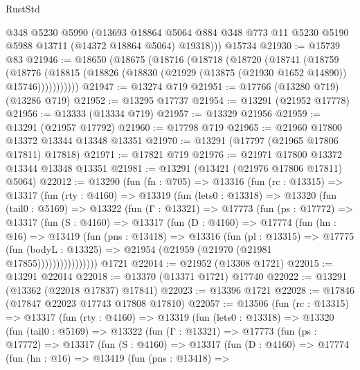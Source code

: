 \begin{lexlean}{RustStd}
\begin{coremodule}
        @348
        @5230
        @5990
        (@13693
          @18864
          @5064
          @884
          @348
          @773
          @11
          @5230
          @5190
          @5988
          @13711
          (@14372 @18864 @5064)
          @19318)))
    @15734
@21930 := @15739 @83
@21946 := @18650
    (@18675
      (@18716
        (@18718
          (@18720
            (@18741
              (@18759
                (@18776
                  (@18815 (@18826 (@18830 (@21929 (@13875 (@21930 @1652 @14890)) @15746)))))))))))
@21947 := @13274 @719
@21951 := @17766 (@13280 @719) (@13286 @719)
@21952 := @13295 @17737
@21954 := @13291 (@21952 @17778)
@21956 := @13333 (@13334 @719)
@21957 := @13329 @21956
@21959 := @13291 (@21957 @17792)
@21960 := @17798 @719
@21965 := @21960 @17800 @13372 @13344 @13348 @13351
@21970 := @13291 (@17797 (@21965 @17806 @17811) @17818)
@21971 := @17821 @719
@21976 := @21971 @17800 @13372 @13344 @13348 @13351
@21981 := @13291 (@13421 (@21976 @17806 @17811) @5064)
@22012 := @13290
    (fun (fn : @705) =>
    @13316
      (fun (rc : @13315) =>
      @13317
        (fun (rty : @4160) =>
        @13319
          (fun (lets0 : @13318) =>
          @13320
            (fun (tail0 : @5169) =>
            @13322
              (fun (Γ : @13321) =>
              @17773
                (fun (ps : @17772) =>
                @13317
                  (fun (S : @4160) =>
                  @13317
                    (fun (D : @4160) =>
                    @17774
                      (fun (hn : @16) =>
                      @13419
                        (fun (pns : @13418) =>
                        @13316
                          (fun (pl : @13315) =>
                          @17775
                            (fun (bodyL : @13325) =>
                            @21954 (@21959 (@21970 (@21981 @17855))))))))))))))))
    @1721
@22014 := @21952 (@13308 @1721)
@22015 := @13291 @22014
@22018 := @13370 (@13371 @1721) @17740
@22022 := @13291 (@13362 (@22018 @17837) @17841)
@22023 := @13396 @1721
@22028 := @17846 (@17847 @22023 @17743 @17808 @17810)
@22057 := @13506
    (fun (rc : @13315) =>
    @13317
      (fun (rty : @4160) =>
      @13319
        (fun (lets0 : @13318) =>
        @13320
          (fun (tail0 : @5169) =>
          @13322
            (fun (Γ : @13321) =>
            @17773
              (fun (ps : @17772) =>
              @13317
                (fun (S : @4160) =>
                @13317
                  (fun (D : @4160) =>
                  @17774
                    (fun (hn : @16) =>
                    @13419
                      (fun (pns : @13418) =>

\end{coremodule}
\end{lexlean}

